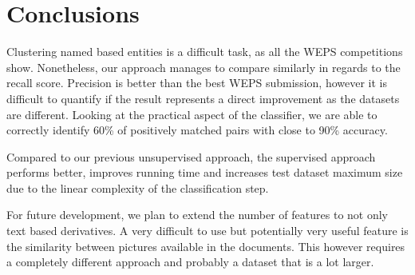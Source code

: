 \chapter{Conclusions}
\label{chapter:conclusions}

Clustering named  based entities is a difficult task, as all the WEPS competitions show.
Nonetheless, our approach manages to compare similarly in regards to the recall score.
Precision is better than the best WEPS submission, however it is difficult to quantify
if the result represents a direct improvement as the datasets are different.
Looking at the practical aspect of the classifier, we are able to correctly
identify 60\% of positively matched pairs with close to 90\% accuracy.

Compared to our previous unsupervised approach, the supervised approach performs
better, improves running time and increases test dataset maximum size due to the
linear complexity of the classification step.

For future development, we plan to extend the number of features to not only
text based derivatives. A very difficult to use but potentially very useful feature
is the similarity between pictures available in the documents. This however requires
a completely different approach and probably a dataset that is a lot larger.
